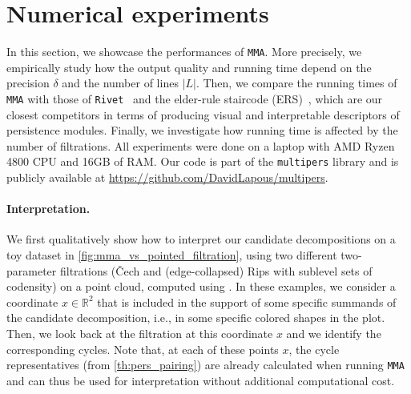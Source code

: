 \documentclass{article}
\newcommand{\R}{\mathbb{R}}
\newcommand{\RIVET}{\texttt{Rivet}}
\newcommand{\MMA}{\texttt{MMA}}
\newcommand{\mmaout}{candidate}
\begin{document}
\section{Numerical experiments}
\label{sec:expe}


In this section, we showcase the performances of \MMA{}.
More precisely, we empirically study how the output quality and running time depend on the precision $\delta$ and the number of lines $|L|$. %
Then, we compare the running times of \MMA{} with those of
\RIVET~\cite{lesnickInteractiveVisualization2D2015} and the elder-rule
staircode (ERS)~\cite{caiElderRuleStaircodesAugmentedMetric2021},
which are our closest competitors in terms of producing visual and interpretable descriptors of persistence modules. %
Finally, we investigate how running time is affected by the number of filtrations. %
All experiments were done on a laptop with AMD Ryzen 4800 CPU and 16GB of RAM.
Our code is part of the \texttt{multipers} library
\cite{loiseauxMultipersMultiparameterPersistence2024} and is publicly available at \url{https://github.com/DavidLapous/multipers}. %

\paragraph*{Interpretation.}\label{expe:interpretability}
We first qualitatively show how to interpret our \mmaout{} decompositions on a toy
dataset in \cref{fig:mma_vs_pointed_filtration}, using two different
two-parameter filtrations (Čech and (edge-collapsed) Rips with sublevel sets of codensity) on a point cloud, computed using \cite{alonsoDelaunayBifiltrationsFunctions2024}.
In these examples,
we consider a coordinate $x\in \R^2$ that is included in the support of some specific summands of the \mmaout{} decomposition, i.e., in some specific colored shapes in the plot.
Then, we look back at the filtration at this coordinate $x$ and we identify the corresponding cycles.
Note that, at each of these points $x$, the cycle representatives (from
\cref{th:pers_pairing}) are already calculated when running \MMA{} and can thus be used for interpretation without additional computational cost.
\end{document}

